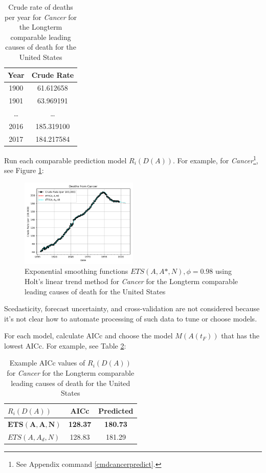 \documentclass[10pt, a4paper, twocolumn]{IEEEconf}
\begin{document}
\begin{table}[H]
  \centering
  \begin{tabular}{cc}
    \toprule
      Year   & Crude Rate \\
    \midrule
      1900   &  61.612658 \\
      1901   &  63.969191 \\
      \ldots &     \ldots \\
      2016   & 185.319100 \\
      2017   & 184.217584 \\
    \bottomrule
  \end{tabular}
  \caption{Crude rate of deaths per year for \textit{Cancer} for the Longterm comparable leading causes of death for the United States}
  \label{table:daa1}
\end{table}

Run each comparable prediction model $R_i(D(A))$.
For example, for \textit{Cancer}\footnote{See Appendix command \ref{cmdcancerpredict}.}, see Figure \ref{fig:fig1}:

\begin{figure}[H]
  \centering
  \includegraphics[width=0.5\textwidth]{results/US_ICD_LONGTERM_COMPARABLE_LEADING_Cancer_ets.png}
  \caption{Exponential smoothing functions $ETS(A,A*,N),\phi=0.98$ using Holt's linear trend method for \textit{Cancer} for the Longterm comparable leading causes of death for the United States}\label{fig:fig1}
\end{figure}

Scedasticity, forecast uncertainty, and cross-validation are not considered because it's not clear how to automate processing of such data to tune or choose models.

For each model, calculate AICc and choose the model $M(A(t_F))$ that has the lowest AICc.
For example, see Table \ref{table:choosem}:

\begin{table}[H]
  \centering
  \begin{tabular}{lcc}
    \toprule
      $R_i(D(A))$       & AICc            & Predicted       \\
    \midrule
      $\bm{ETS(A,A,N)}$ & \textbf{128.37} & \textbf{180.73} \\
      $ETS(A,A_d,N)$    & 128.83          & 181.29          \\
    \bottomrule
  \end{tabular}
  \caption{Example AICc values of $R_i(D(A))$ for \textit{Cancer} for the Longterm comparable leading causes of death for the United States}
  \label{table:choosem}
\end{table}
\end{document}
